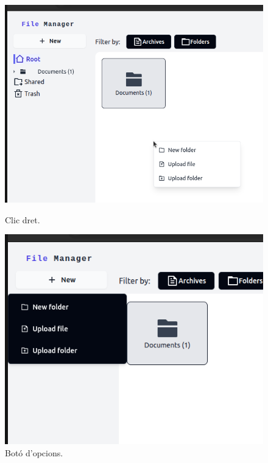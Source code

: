 \begin{figure}[H]
    \centering
    \begin{minipage}{0.32\textwidth}
        \centering
        \includegraphics[width=\linewidth]{Figures/ui-web/context_menu_right_click.png}
        \caption{Clic dret.}
    \end{minipage}\hfill
    \begin{minipage}{0.32\textwidth}
        \centering
        \includegraphics[width=\linewidth]{Figures/ui-web/contex_menu_button.png}
        \caption{Botó d'opcions.}
    \end{minipage}\hfill
    \begin{minipage}{0.32\textwidth}

\end{minipage}
\end{figure}
